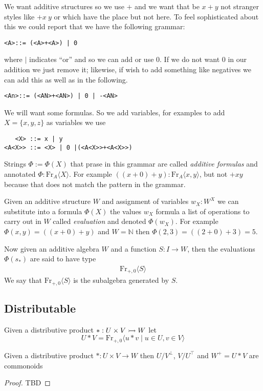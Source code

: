 We want additive structures so we use $+$ and we want that be $x+y$ not stranger 
styles like $+x~y$ or  which have the place but not here.
To feel sophisticated about this we could report that we have the following 
grammar:
\begin{center}
\begin{lstlisting}
<A>::= (<A>+<A>) | 0
\end{lstlisting}   
\end{center}
where $|$ indicates ``or'' and so we can add or use $0$.  If we do not want 
$0$ in our addition we just remove it; likewise, if wish to add something like 
negatives we can add this as well as in the following.
\begin{center}
\begin{lstlisting}
<An>::= (<AN>+<AN>) | 0 | -<AN>
\end{lstlisting}   
\end{center}


We will want some formulas.  So we add variables, 
for examples to add $X=\{x,y,z\}$ as variables we use
\begin{center}
\begin{lstlisting}
   <X> ::= x | y 
<A<X>> ::= <X> | 0 |(<A<X>>+<A<X>>)      
\end{lstlisting}
\end{center}


Strings $\Phi:=\Phi(X)$ that prase in this grammar are called \emph{additive formulas} 
and annotated $\Phi:\text{Fr}_{A}\langle X\rangle$.  For example 
$((x+0)+y):\text{Fr}_A\langle x,y\rangle$, 
but not $+xy$ because that does not match the pattern in the grammar.

Given an additive structure $W$ and assignment of variables $w_X:W^X$
we can substitute into a formula $\Phi(X)$ the values $w_X$ formula 
a list of operations to carry out in $W$ called \emph{evaluation} and denoted 
$\Phi(w_X)$.  For example $\Phi(x,y)=((x+0)+y)$ and $W=\mathbb{N}$ then 
$\Phi(2,3)=((2+0)+3)=5$.  

Now given an additive algebra $W$ and a function $S:I\to W$, then 
the evaluations $\Phi(s_*)$ are said to have type 
\begin{align*}
    \text{Fr}_{+,0}\langle S\rangle 
\end{align*}
We say that $\text{Fr}_{+,0}\langle S\rangle$ is the subalgebra generated 
by $S$.

\subsection{Distributable}
\begin{definition}
    Given a distributive product $*:U\times V\rightarrowtail W$
    let 
    \[
        U*V=\text{Fr}_{+,0}\langle u*v \mid u\in U, v\in V\rangle
    \]
\end{definition}

\begin{proposition}
    Given a distributive product $*:U\times V\to W$ then 
    $U/V^{\bot}$, $V/U^{\top}$ and $W^+=U*V$ are commonoids
\end{proposition}
\begin{proof}
    TBD
\end{proof}
